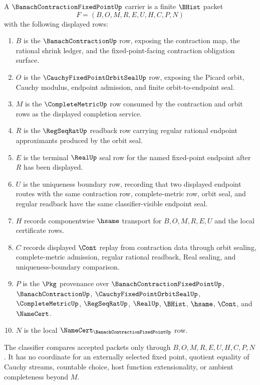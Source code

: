 \begin{definition}
\label{def:banach-contraction-fixed-point-carrier}
A $\BanachContractionFixedPointUp$ carrier is a finite $\BHist$ packet
$$
F=(B,O,M,R,E,U,H,C,P,N)
$$
with the following displayed rows:
\begin{enumerate}
\item $B$ is the $\BanachContractionUp$ row, exposing the contraction map, the rational shrink ledger, and the fixed-point-facing contraction obligation surface.
\item $O$ is the $\CauchyFixedPointOrbitSealUp$ row, exposing the Picard orbit, Cauchy modulus, endpoint admission, and finite orbit-to-endpoint seal.
\item $M$ is the $\CompleteMetricUp$ row consumed by the contraction and orbit rows as the displayed completion service.
\item $R$ is the $\RegSeqRatUp$ readback row carrying regular rational endpoint approximants produced by the orbit seal.
\item $E$ is the terminal $\RealUp$ seal row for the named fixed-point endpoint after $R$ has been displayed.
\item $U$ is the uniqueness boundary row, recording that two displayed endpoint routes with the same contraction row, complete-metric row, orbit seal, and regular readback have the same classifier-visible endpoint seal.
\item $H$ records componentwise $\hsame$ transport for $B,O,M,R,E,U$ and the local certificate rows.
\item $C$ records displayed $\Cont$ replay from contraction data through orbit sealing, complete-metric admission, regular rational readback, Real sealing, and uniqueness-boundary comparison.
\item $P$ is the $\Pkg$ provenance over $\BanachContractionFixedPointUp$, $\BanachContractionUp$, $\CauchyFixedPointOrbitSealUp$, $\CompleteMetricUp$, $\RegSeqRatUp$, $\RealUp$, $\BHist$, $\hsame$, $\Cont$, and $\NameCert$.
\item $N$ is the local $\NameCert_{\BanachContractionFixedPointUp}$ row.
\end{enumerate}
The classifier compares accepted packets only through $B,O,M,R,E,U,H,C,P,N$. It has no coordinate for an externally selected fixed point, quotient equality of Cauchy streams, countable choice, host function extensionality, or ambient completeness beyond $M$.
\end{definition}

